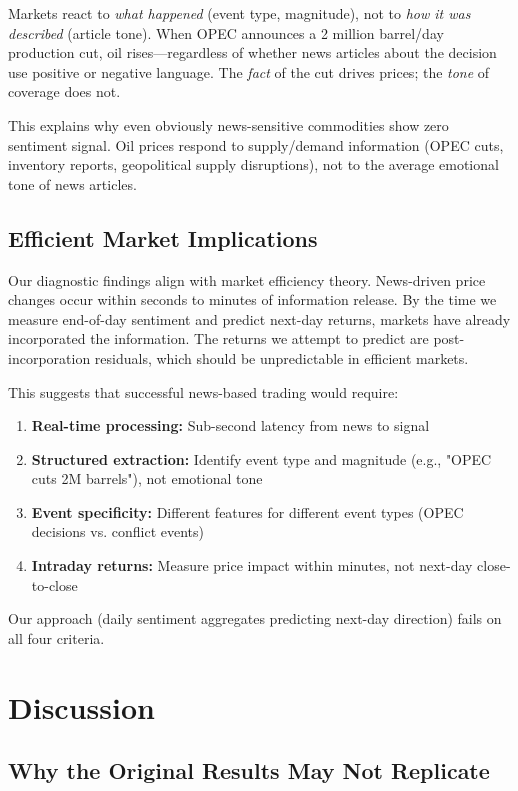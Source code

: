 \documentclass[11pt]{article}
\begin{document}
Markets react to \textit{what happened} (event type, magnitude), not to \textit{how it was described} (article tone). When OPEC announces a 2 million barrel/day production cut, oil rises---regardless of whether news articles about the decision use positive or negative language. The \textit{fact} of the cut drives prices; the \textit{tone} of coverage does not.

This explains why even obviously news-sensitive commodities show zero sentiment signal. Oil prices respond to supply/demand information (OPEC cuts, inventory reports, geopolitical supply disruptions), not to the average emotional tone of news articles.

\subsection{Efficient Market Implications}

Our diagnostic findings align with market efficiency theory. News-driven price changes occur within seconds to minutes of information release. By the time we measure end-of-day sentiment and predict next-day returns, markets have already incorporated the information. The returns we attempt to predict are post-incorporation residuals, which should be unpredictable in efficient markets.

This suggests that successful news-based trading would require:
\begin{enumerate}
    \item \textbf{Real-time processing:} Sub-second latency from news to signal
    \item \textbf{Structured extraction:} Identify event type and magnitude (e.g., "OPEC cuts 2M barrels"), not emotional tone
    \item \textbf{Event specificity:} Different features for different event types (OPEC decisions vs. conflict events)
    \item \textbf{Intraday returns:} Measure price impact within minutes, not next-day close-to-close
\end{enumerate}

Our approach (daily sentiment aggregates predicting next-day direction) fails on all four criteria.

\section{Discussion}

\subsection{Why the Original Results May Not Replicate}
\end{document}
